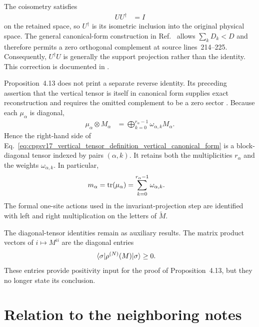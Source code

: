 \documentclass{article}
\begin{document}
The coisometry satisfies
\begin{align}
    UU^\dagger
        &=I
    \label{eq:cpgsv17_vertical_tensor_definition_coisometry}
\end{align}
on the retained space, so $U^\dagger$ is its isometric inclusion into the
original physical space. The general canonical-form construction in
Ref.~\cite{Cirac2016MPDO_arXiv} allows $\sum_kD_k<D$ and therefore permits a
zero orthogonal complement at source lines~214--225. Consequently,
$U^\dagger U$ is generally the support projection rather than the identity.
This correction is documented in
.

Proposition~4.13 does not print a separate reverse identity. Its preceding
assertion that the vertical tensor is itself in canonical form supplies exact
reconstruction and requires the omitted complement to be a zero sector
\cite[Proposition~4.13]{Cirac2016MPDO_arXiv}. Because each $\mu_\alpha$ is
diagonal,
\begin{align}
    \mu_\alpha\otimes M_\alpha
        &=
        \bigoplus_{k=0}^{r_\alpha-1}
        \omega_{\alpha,k}M_\alpha.
    \label{eq:cpgsv17_vertical_tensor_definition_weighted_sector_sum}
\end{align}
Hence the right-hand side of
Eq.~\ref{eq:cpgsv17_vertical_tensor_definition_vertical_canonical_form} is a
block-diagonal tensor indexed by pairs $(\alpha,k)$. It retains both the
multiplicities $r_\alpha$ and the weights $\omega_{\alpha,k}$. In particular,
\begin{align}
    m_\alpha
        &=
        \operatorname{tr}(\mu_\alpha)
        =
        \sum_{k=0}^{r_\alpha-1}\omega_{\alpha,k}.
    \label{eq:cpgsv17_vertical_tensor_definition_recovered_multiplicity}
\end{align}
The formal one-site actions used in the invariant-projection step are
identified with left and right multiplication on the letters of
$\widetilde M$.

The diagonal-tensor identities remain as auxiliary results. The matrix product
vectors of $i\mapsto M^{ii}$ are the diagonal entries
\begin{align}
    \langle \sigma|\rho^{(N)}(M)|\sigma\rangle
        &\geq0.
    \label{eq:cpgsv17_vertical_tensor_definition_diagonal_density_entry}
\end{align}
These entries provide positivity input for the proof of Proposition~4.13, but
they no longer state its conclusion.

\section{Relation to the neighboring notes}
\end{document}
